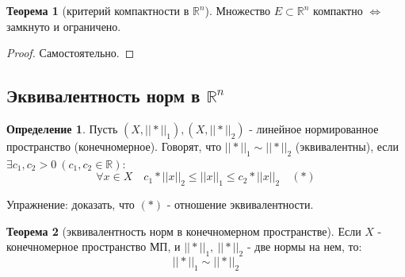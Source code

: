 \documentclass{report}
\theoremstyle{definition}
\newtheorem{definition}{Определение}[section]
\newtheorem{theorem}{Теорема}[section]
\begin{document}
\begin{theorem}[критерий компактности в $\mathbb{R}^n$]
  Множество $E \subset \mathbb{R}^n$ компактно $\iff$ замкнуто и ограничено.
\end{theorem}

\begin{proof}
  Самостоятельно.
\end{proof}

\subsection{Эквивалентность норм в $\mathbb{R}^n$}

\begin{definition}
  Пусть $(X, ||*||_1),(X, ||*||_2)$ - линейное нормированное пространство (конечномерное). Говорят, что $||*||_1
    \sim ||*||_2$ (эквивалентны), если $\exists c_1,c_2 > 0 \ (c_1,c_2 \in \mathbb{R}):$
  \begin{equation*}
    \forall x \in X \quad c_1 * ||x||_2 \leqslant ||x||_1 \leqslant c_2 * ||x||_2 \quad (*)
  \end{equation*}
\end{definition}

Упражнение: доказать, что $(*)$ - отношение эквивалентности.

\begin{theorem}[эквивалентность норм в конечномерном пространстве]
  Если $X$ - конечномерное пространство МП, и $||*||_1, \ ||*||_2$ - две нормы на нем, то:
  \begin{equation*}
    ||*||_1 \sim ||*||_2
  \end{equation*}
\end{theorem}
\end{document}
